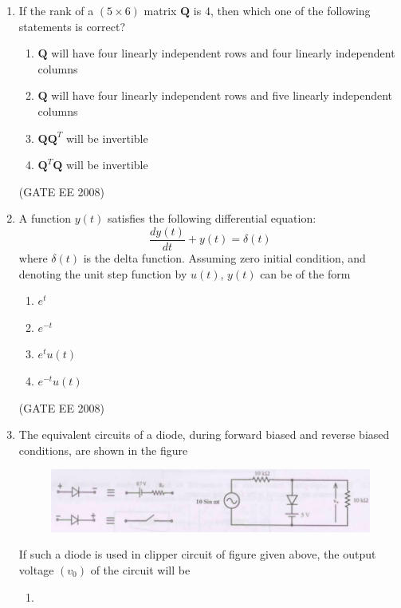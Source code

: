 \documentclass[journal,12pt,onecolumn]{IEEEtran}
\theoremstyle{remark}
\begin{document}
\begin{enumerate}[start=1, label=Q.\arabic*]
\item If the rank of a $(5 \times 6)$ matrix $\mathbf{Q}$ is $4$, then which one of the following statements is correct?

\begin{enumerate}
    \item $\mathbf{Q}$ will have four linearly independent rows and four linearly independent columns
    \item $\mathbf{Q}$ will have four linearly independent rows and five linearly independent columns
    \item $\mathbf{Q} \mathbf{Q}^T$ will be invertible
    \item $\mathbf{Q}^T \mathbf{Q}$ will be invertible
\end{enumerate}
\hfill (GATE EE 2008)




\item A function $y(t)$ satisfies the following differential equation:
\[
\frac{dy(t)}{dt} + y(t) = \delta(t)
\]
where $\delta(t)$ is the delta function. Assuming zero initial condition, and denoting the unit step function by $u(t)$, $y(t)$ can be of the form

\begin{enumerate}
    \item $e^{t}$
    \item $e^{-t}$
    \item $e^{t}u(t)$
    \item $e^{-t}u(t)$
\end{enumerate}
\hfill (GATE EE 2008)





\item The equivalent circuits of a diode, during forward biased and reverse biased
conditions, are shown in the figure
\begin{figure}[H]
    \includegraphics[width=\columnwidth]{Fig/q8.png}
    \caption{}
\end{figure}
If such a diode is used in clipper circuit of figure given above, the output voltage $(v_0)$ of the circuit will be
\begin{enumerate}
\item 
\begin{figure}[H]
    

\end{figure}
\end{enumerate}
\end{enumerate}
\end{document}
